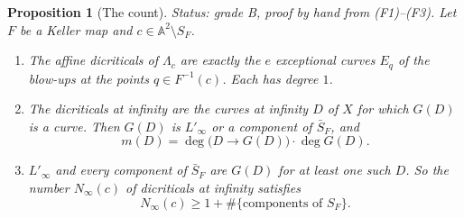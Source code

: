 \documentclass[a4paper,11pt]{article}
\theoremstyle{plain}
\newtheorem{proposition}[theorem]{Proposition}
\theoremstyle{definition}
\theoremstyle{remark}
\begin{document}
\begin{proposition}[The count]\label{td:prop:count}
\textit{Status: grade B, proof by hand from \textnormal{(F1)--(F3)}.}
Let $F$ be a Keller map and $c \in \mathbb{A}^2 \setminus S_F$.
\begin{enumerate}[label=(\alph*),nosep]
\item The affine dicriticals of $\Lambda_c$ are exactly the $e$ exceptional curves $E_q$ of
the blow-ups at the points $q \in F^{-1}(c)$. Each has degree $1$.
\item The dicriticals at infinity are the curves at infinity $D$ of $X$ for which $G(D)$ is a
curve. Then $G(D)$ is $L'_\infty$ or a component of $\bar{S}_F$, and
\begin{equation}\label{td:eq:count-degree}
m(D) = \deg\big(D \to G(D)\big) \cdot \deg G(D).
\end{equation}
\item $L'_\infty$ and every component of $\bar{S}_F$ are $G(D)$ for at least one such $D$.
So the number $N_\infty(c)$ of dicriticals at infinity satisfies
\begin{equation}\label{td:eq:count-lower}
N_\infty(c) \geq 1 + \#\{\text{components of } S_F\}.
\end{equation}
\end{enumerate}
\end{proposition}
\end{document}
